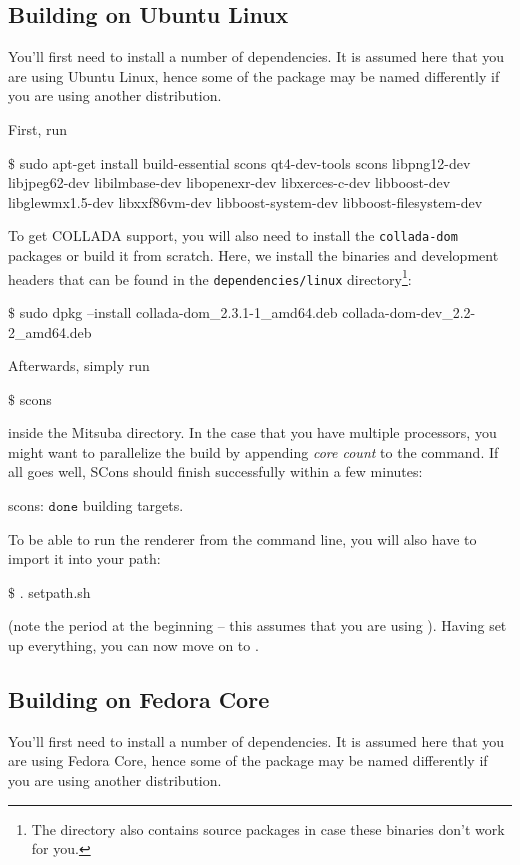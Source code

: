 \subsection{Building on Ubuntu Linux}
You'll first need to install a number of dependencies. It is assumed here
that you are using Ubuntu Linux, hence some of the package may be named differently if you are 
using another distribution.

First, run
\begin{shell}
$\text{\$}$ sudo apt-get install build-essential scons qt4-dev-tools scons libpng12-dev libjpeg62-dev libilmbase-dev libopenexr-dev libxerces-c-dev libboost-dev libglewmx1.5-dev libxxf86vm-dev libboost-system-dev libboost-filesystem-dev
\end{shell}
To get COLLADA support, you will also need to install the \texttt{collada-dom} packages or build it from scratch. Here, we install the  binaries and development headers that can be found in the \texttt{dependencies/linux} directory\footnote{The directory also contains source packages in case these binaries don't work for you.}:
\begin{shell}
$\text{\$}$ sudo dpkg --install collada-dom_2.3.1-1_amd64.deb collada-dom-dev_2.2-2_amd64.deb
\end{shell}
Afterwards, simply run
\begin{shell}
$\text{\$}$ scons
\end{shell}
inside the Mitsuba directory. In the case that you have multiple processors, you might want to parallelize the build by appending \emph{core count} to the command.
If all goes well, SCons should finish successfully within a few minutes:
\begin{shell}
scons: $\texttt{done}$ building targets.
\end{shell}
To be able to run the renderer from the command line, you will also have to import it into your path:
\begin{shell}
$\text{\$}$ . setpath.sh
\end{shell}
(note the period at the beginning -- this assumes that you are using ).
Having set up everything, you can now move on to .

\subsection{Building on Fedora Core}
You'll first need to install a number of dependencies. It is assumed here
that you are using Fedora Core, hence some of the package may be named differently if you are 
using another distribution.

